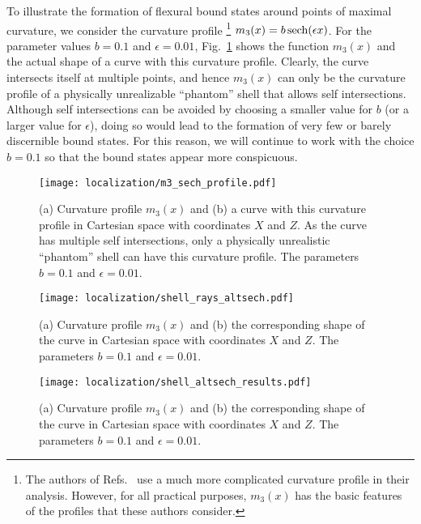 To illustrate the formation of flexural bound states around points of maximal curvature, we consider the curvature profile%
\footnote{The authors of Refs.~\cite{sondergaard2002,mohammed2021} use a much more complicated curvature profile in their analysis.  However, for all practical purposes, $m_{3}(x)$ has the basic features of the profiles that these authors consider.}
$m_{3}(x) = b\operatorname{sech}(\epsilon x)$.
For the parameter values $b = 0.1$ and $\epsilon = 0.01$, Fig.~\ref{fig:shell_m3_profile} shows the function $m_{3}(x)$ and the actual shape of a curve with this curvature profile.
Clearly, the curve intersects itself at multiple points, and hence $m_{3}(x)$ can only be the curvature profile of a physically unrealizable ``phantom'' shell that allows self intersections.
Although self intersections can be avoided by choosing a smaller value for $b$ (or a larger value for $\epsilon$), doing so would lead to the formation of very few or barely discernible bound states.
For this reason, we will continue to work with the choice $b=0.1$ so that the bound states appear more conspicuous.
%
\begin{figure}
  \begin{center}
    \texttt{[image: localization/m3\_sech\_profile.pdf]}
  \end{center}
  \caption{%
    (a) Curvature profile $m_{3}(x)$ and (b) a curve with this curvature profile in Cartesian space with coordinates $X$ and $Z$.
    As the curve has multiple self intersections, only a physically unrealistic ``phantom'' shell can have this curvature profile.
    The parameters $b = 0.1$ and $\epsilon = 0.01$.
  }
  \label{fig:shell_m3_profile}
\end{figure}

\begin{figure}
  \begin{center}
    \texttt{[image: localization/shell\_rays\_altsech.pdf]}
  \end{center}
  \caption{%
    (a) Curvature profile $m_{3}(x)$ and (b) the corresponding shape of the curve in Cartesian space with coordinates $X$ and $Z$.
    The parameters $b = 0.1$ and $\epsilon = 0.01$.
  }
  \label{fig:shell_m3_rays}
\end{figure}

\begin{figure}
  \begin{center}
    \texttt{[image: localization/shell\_altsech\_results.pdf]}
  \end{center}
  \caption{%
    (a) Curvature profile $m_{3}(x)$ and (b) the corresponding shape of the curve in Cartesian space with coordinates $X$ and $Z$.
    The parameters $b = 0.1$ and $\epsilon = 0.01$.
  }
  \label{fig:shell_m3_results}
\end{figure}



